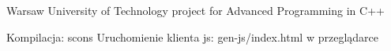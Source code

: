 Warsaw University of Technology project for Advanced Programming in C++

Kompilacja\+: scons Uruchomienie klienta js\+: gen-\/js/index.\+html w przeglądarce 
